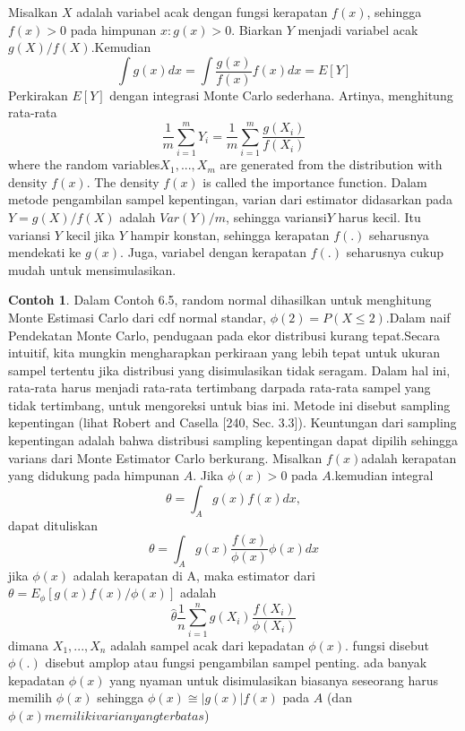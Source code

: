 \documentclass[a4paper,12pt]{article}
\theoremstyle{definition}
\newtheorem{example}{Contoh}[section]
\begin{document}
Misalkan $X$ adalah variabel acak dengan fungsi kerapatan $f(x)$, sehingga $f(x) > 0$ pada himpunan ${x : g(x) > 0}$. Biarkan $Y$ menjadi variabel acak $g(X)/f(X)$.Kemudian
\begin{equation*}
    \int g(x)dx=\int \frac{g(x)}{f(x)}f(x)dx=E\left [ Y \right ]
\end{equation*}
Perkirakan $E[Y]$ dengan integrasi Monte Carlo sederhana. Artinya, menghitung rata-rata
\begin{equation*}
    \frac{1}{m}\sum_{i=1}^{m}Y_{i}=\frac{1}{m}\sum_{i=1}^{m}\frac{g(X_{i})}{f(X_{i})}
\end{equation*}
where the random variables$ X_{1}, . . . , X_{m}$ are generated from the distribution with density $f(x)$. The density $f(x)$ is called the importance function.
Dalam metode pengambilan sampel kepentingan, varian dari estimator didasarkan
pada $Y = g(X)/f(X)$ adalah $Var(Y)/m$, sehingga variansi$Y$ harus kecil. Itu variansi $Y$ kecil jika $Y$ hampir konstan, sehingga kerapatan $f(.)$ seharusnya mendekati ke $g(x)$. Juga, variabel dengan kerapatan $f(.)$ seharusnya cukup mudah untuk mensimulasikan.
\begin{example}
    Dalam Contoh 6.5, random normal dihasilkan untuk menghitung Monte Estimasi Carlo dari cdf normal standar, $\phi (2)=P(X\leq 2)$.Dalam naif Pendekatan Monte Carlo, pendugaan pada ekor distribusi kurang tepat.Secara intuitif, kita mungkin mengharapkan perkiraan yang lebih tepat untuk ukuran sampel tertentu jika distribusi yang disimulasikan tidak seragam. Dalam hal ini, rata-rata harus menjadi rata-rata tertimbang darpada rata-rata sampel yang tidak tertimbang, untuk mengoreksi untuk bias ini. Metode ini disebut sampling kepentingan (lihat Robert and Casella [240, Sec. 3.3]). Keuntungan dari sampling kepentingan adalah bahwa distribusi sampling kepentingan dapat dipilih sehingga varians dari Monte Estimator Carlo berkurang.
    Misalkan $f(x)$adalah kerapatan yang didukung pada himpunan $A$. Jika $\phi(x)>0$ pada $A$.kemudian integral
    \begin{equation*}
        \theta=\int_{A}g(x)f(x)dx,
    \end{equation*}
    dapat dituliskan
    \begin{equation*}
        \theta=\int_{A}g(x)\frac{f(x)}{\phi (x)}\phi(x)dx
    \end{equation*}
    jika $\phi(x)$ adalah kerapatan di A, maka estimator dari $\theta=E_{\phi}\left [ g(x)f(x)/\phi (x) \right ]$ adalah
    \begin{equation*}
        \widehat{\theta}\frac{1}{n}\sum_{i=1}^{n}g(X_{i})\frac{f(X_{i})}{\phi(X_{i})}
    \end{equation*}
    dimana $X_{1},...,X_{n}$ adalah sampel acak dari kepadatan $\phi(x)$. fungsi disebut $\phi(.)$ disebut amplop atau fungsi pengambilan sampel penting. ada banyak kepadatan $\phi(x)$ yang nyaman untuk disimulasikan
    biasanya seseorang harus memilih $\phi(x)$ sehingga $\phi (x)\cong \left | g(x) \right |f(x)$ pada $A$ (dan $\phi(x) memiliki varian yang terbatas$)
\end{example}
\end{document}
